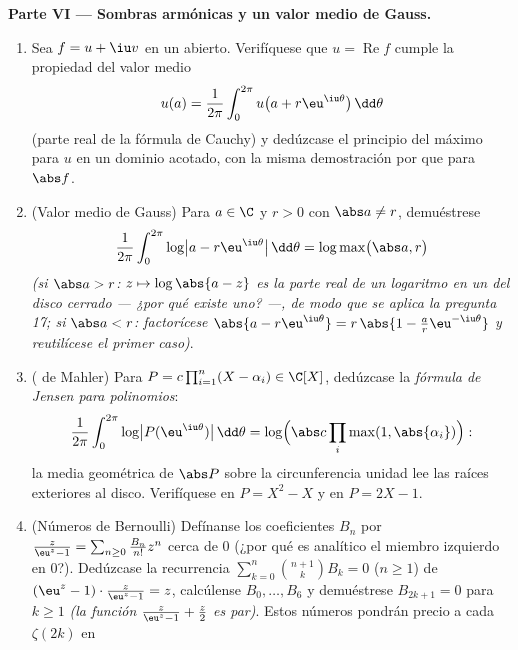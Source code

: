 \begin{problem}
\medskip
\noindent\textbf{Parte VI --- Sombras armónicas y un valor medio de
Gauss.}
\begin{enumerate}[resume]
  \item Sea $f = u + \iu v$ 
  en un abierto. Verifíquese que
  $u = \operatorname{Re}f$ cumple la propiedad del valor medio
        \[
        u(a) = \frac1{2\pi}\int_0^{2\pi}
        u\bigl(a + r\eu^{\iu\theta}\bigr)\,\dd\theta
        \]
        (parte real de la fórmula de Cauchy) y dedúzcase el principio
        del máximo para $u$ en un dominio acotado, con la misma
        demostración por 
        que para $\abs f$. \item (Valor medio de Gauss) Para $a \in \C$
        y $r > 0$ con $\abs a \neq r$, demuéstrese
        \[
        \frac1{2\pi}\int_0^{2\pi}
        \log\bigl|a - r\eu^{\iu\theta}\bigr|\,\dd\theta
        = \log\max\bigl(\abs a, r\bigr)
        \]
        \emph{(si $\abs a > r$: $z \mapsto \log\abs{a - z}$ es la parte
        real de un logaritmo 
        en un  del disco
        cerrado --- ¿por qué existe uno? ---, de modo que se aplica la
        pregunta 17; si $\abs a < r$: factorícese
        $\abs{a - r\eu^{\iu\theta}} = r\,\abs{1 -
        \frac ar\eu^{-\iu\theta}}$ y reutilícese el primer caso)}. \item
        ( de Mahler) Para
        $P = c\prod_{i=1}^n(X -
        \alpha_i) \in \C[X]$, dedúzcase la \emph{fórmula de Jensen para
        polinomios}:
        \[
        \frac1{2\pi}\int_0^{2\pi}\log\bigl|P(\eu^{\iu\theta})
        \bigr|\,\dd\theta
        = \log\Bigl(\abs c\prod_{i}\max(1,
        \abs{\alpha_i})\Bigr) :
        \]
        la media geométrica de $\abs P$ sobre la circunferencia unidad
        lee las raíces exteriores al disco. Verifíquese en $P =
        X^2 - X$ y en $P = 2X - 1$. \item (Números de Bernoulli)
        Defínanse los coeficientes $B_n$ por
        $\frac{z}{\eu^z - 1} = \sum_{n\geq0}\frac{B_n}{n!}
        z^n$ cerca de $0$ (¿por qué es analítico el miembro izquierdo en
        $0$?). Dedúzcase la recurrencia
        $\sum_{k=0}^{n}\binom{n+1}kB_k = 0$ ($n \geq 1$) de
        $(\eu^z - 1)\cdot\frac z{\eu^z-1} = z$, calcúlense $B_0,
        \dots, B_6$ y demuéstrese $B_{2k+1} = 0$ para $k \geq 1$
        \emph{(la función $\frac z{\eu^z-1} + \frac z2$ es par)}. Estos
        números pondrán precio a cada $\zeta(2k)$ en

\end{enumerate}
\end{problem}
